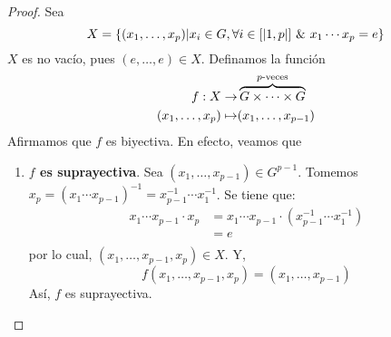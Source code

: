 \documentclass[12pt]{report}
\theoremstyle{largebreak}
\begin{document}
    \begin{proof}
        Sea
        \begin{equation*}
            X=\left\{(x_1,\dots,x_p)|x_i\in G,\forall i\in [|1,p|]\textup{ \& }x_1\cdots x_p=e \right\}
        \end{equation*}
        $X$ es no vacío, pues $(e,\dots,e)\in X$. Definamos la función 
        \begin{equation*}
            \begin{split}
                f:X\rightarrow& \overbrace{G\times\cdots\times G}^{p\textup{-veces}}\\
                (x_1,\dots,x_p) \mapsto& (x_1,\dots,x_{p-1})\\
            \end{split}
        \end{equation*}
        Afirmamos que $f$ es biyectiva. En efecto, veamos que
        \begin{enumerate}
            \item \textbf{$f$ es suprayectiva}. Sea $(x_1,\dots,x_{p-1})\in G^{p-1}$. Tomemos $x_p=(x_1\cdots x_{p-1})^{-1}=x_{p-1}^{-1}\cdots x_1^{-1}$. Se tiene que:
            \begin{equation*}
                \begin{split}
                    x_1\cdots x_{p-1}\cdot x_p&=x_1\cdots x_{p-1}\cdot(x_{p-1}^{-1}\cdots x_1^{-1})\\
                    &=e\\
                \end{split}
            \end{equation*}
            por lo cual, $(x_1,\dots,x_{p-1},x_p)\in X$. Y,
            \begin{equation*}
                f(x_1,\dots,x_{p-1},x_p)=(x_1,\dots,x_{p-1})
            \end{equation*}
            Así, $f$ es suprayectiva.


\end{enumerate}
\end{proof}
\end{document}
